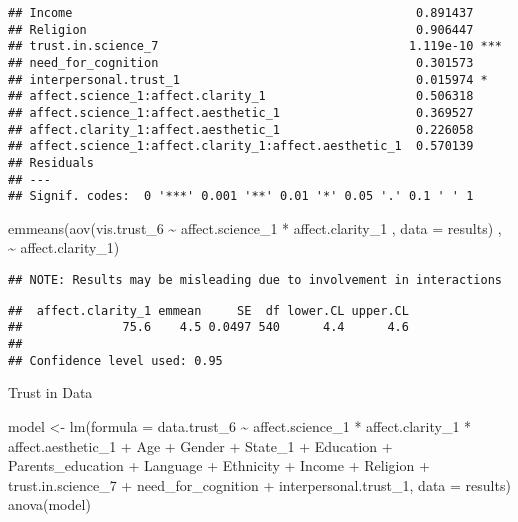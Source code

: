 \documentclass[
]{article}
\newenvironment{Shaded}{\begin{snugshade}}{\end{snugshade}}
\newcommand{\AttributeTok}[1]{\textcolor[rgb]{0.77,0.63,0.00}{#1}}
\newcommand{\FunctionTok}[1]{\textcolor[rgb]{0.00,0.00,0.00}{#1}}
\newcommand{\NormalTok}[1]{#1}
\newcommand{\OtherTok}[1]{\textcolor[rgb]{0.56,0.35,0.01}{#1}}
\newcommand{\SpecialCharTok}[1]{\textcolor[rgb]{0.00,0.00,0.00}{#1}}
\begin{document}
\begin{verbatim}
## Income                                                0.891437    
## Religion                                              0.906447    
## trust.in.science_7                                   1.119e-10 ***
## need_for_cognition                                    0.301573    
## interpersonal.trust_1                                 0.015974 *  
## affect.science_1:affect.clarity_1                     0.506318    
## affect.science_1:affect.aesthetic_1                   0.369527    
## affect.clarity_1:affect.aesthetic_1                   0.226058    
## affect.science_1:affect.clarity_1:affect.aesthetic_1  0.570139    
## Residuals                                                         
## ---
## Signif. codes:  0 '***' 0.001 '**' 0.01 '*' 0.05 '.' 0.1 ' ' 1
\end{verbatim}

\begin{Shaded}
\begin{Highlighting}[]
\FunctionTok{emmeans}\NormalTok{(}\FunctionTok{aov}\NormalTok{(vis.trust\_6 }\SpecialCharTok{\textasciitilde{}}\NormalTok{ affect.science\_1 }\SpecialCharTok{*}\NormalTok{ affect.clarity\_1 , }\AttributeTok{data =}\NormalTok{ results) , }\SpecialCharTok{\textasciitilde{}}\NormalTok{ affect.clarity\_1)}
\end{Highlighting}
\end{Shaded}

\begin{verbatim}
## NOTE: Results may be misleading due to involvement in interactions
\end{verbatim}

\begin{verbatim}
##  affect.clarity_1 emmean     SE  df lower.CL upper.CL
##              75.6    4.5 0.0497 540      4.4      4.6
## 
## Confidence level used: 0.95
\end{verbatim}

Trust in Data

\begin{Shaded}
\begin{Highlighting}[]
\NormalTok{model }\OtherTok{\textless{}{-}} \FunctionTok{lm}\NormalTok{(}\AttributeTok{formula =}\NormalTok{ data.trust\_6 }\SpecialCharTok{\textasciitilde{}}\NormalTok{ affect.science\_1 }\SpecialCharTok{*}\NormalTok{ affect.clarity\_1 }\SpecialCharTok{*}\NormalTok{ affect.aesthetic\_1 }\SpecialCharTok{+}
\NormalTok{              Age }\SpecialCharTok{+}\NormalTok{ Gender }\SpecialCharTok{+}\NormalTok{ State\_1 }\SpecialCharTok{+}\NormalTok{ Education }\SpecialCharTok{+}\NormalTok{ Parents\_education }\SpecialCharTok{+}\NormalTok{ Language }\SpecialCharTok{+} 
\NormalTok{              Ethnicity }\SpecialCharTok{+}\NormalTok{ Income }\SpecialCharTok{+}\NormalTok{ Religion }\SpecialCharTok{+}\NormalTok{ trust.in.science\_7 }\SpecialCharTok{+} 
\NormalTok{              need\_for\_cognition }\SpecialCharTok{+}\NormalTok{ interpersonal.trust\_1,}
            \AttributeTok{data =}\NormalTok{ results)}
\FunctionTok{anova}\NormalTok{(model)}
\end{Highlighting}
\end{Shaded}
\end{document}
